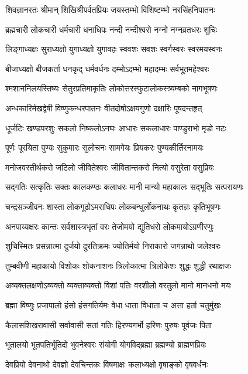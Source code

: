 \twolineshloka
{शिवज्ञानरतः श्रीमान् शिखिश्रीपर्वतप्रियः}
{जयस्तम्भो विशिष्टम्भो नरसिंहनिपातनः}

\twolineshloka
{ब्रह्मचारी लोकचारी धर्मचारी धनाधिपः}
{नन्दी नन्दीश्वरो नग्नो नग्नव्रतधरः शुचिः}

\twolineshloka
{लिङ्गाध्यक्षः सुराध्यक्षो युगाध्यक्षो युगावहः}
{स्ववशः सवशः स्वर्गस्वरः स्वरमयस्वनः}

\twolineshloka
{बीजाध्यक्षो बीजकर्ता धनकृद् धर्मवर्धनः}
{दम्भोऽदम्भो महादम्भः सर्वभूतमहेश्वरः}

\twolineshloka
{श्मशाननिलयस्तिष्यः सेतुरप्रतिमाकृतिः}
{लोकोत्तरस्फुटालोकस्त्र्यम्बको नागभूषणः}

\twolineshloka
{अन्धकारिर्मखद्वेषी विष्णुकन्धरपातनः}
{वीतदोषोऽक्षयगुणो दक्षारिः पूषदन्तहृत्}

\twolineshloka
{धूर्जटिः खण्डपरशुः सकलो निष्कलोऽनघः}
{आधारः सकलाधारः पाण्डुराभो मृडो नटः}

\twolineshloka
{पूर्णः पूरयिता पुण्यः सुकुमारः सुलोचनः}
{सामगेयः प्रियकरः पुण्यकीर्तिरनामयः}

\twolineshloka
{मनोजवस्तीर्थकरो जटिलो जीवितेश्वरः}
{जीवितान्तकरो नित्यो वसुरेता वसुप्रियः}

\twolineshloka
{सद्गतिः सत्कृतिः सक्तः कालकण्ठः कलाधरः}
{मानी मान्यो महाकालः सद्भूतिः सत्परायणः}

\twolineshloka
{चन्द्रसञ्जीवनः शास्ता लोकगूढोऽमराधिपः}
{लोकबन्धुर्लोकनाथः कृतज्ञः कृतिभूषणः}

\twolineshloka
{अनपाय्यक्षरः कान्तः सर्वशास्त्रभृतां वरः}
{तेजोमयो द्युतिधरो लोकमायोऽग्रणीरणुः}

\twolineshloka
{शुचिस्मितः प्रसन्नात्मा दुर्जयो दुरतिक्रमः}
{ज्योतिर्मयो निराकारो जगन्नाथो जलेश्वरः}

\twolineshloka
{तुम्बवीणी महाकायो विशोकः शोकनाशनः}
{त्रिलोकात्मा त्रिलोकेशः शुद्धः शुद्धी रथाक्षजः}

\twolineshloka
{अव्यक्तलक्षणोऽव्यक्तो व्यक्ताव्यक्तो विशां पतिः}
{वरशीलो वरतुलो मानो मानधनो मयः}

\twolineshloka
{ब्रह्मा विष्णुः प्रजापालो हंसो हंसगतिर्यमः}
{वेधा धाता विधाता च अत्ता हर्ता चतुर्मुखः}

\twolineshloka
{कैलासशिखरावासी सर्वावासी सतां गतिः}
{हिरण्यगर्भो हरिणः पुरुषः पूर्वजः पिता}

\twolineshloka
{भूतालयो भूतपतिर्भूतिदो भुवनेश्वरः}
{संयोगी योगविद्ब्रह्मा ब्रह्मण्यो ब्राह्मणप्रियः}

\twolineshloka
{देवप्रियो देवनाथो देवज्ञो देवचिन्तकः}
{विषमाक्षः कलाध्यक्षो वृषाङ्को वृषवर्धनः}

